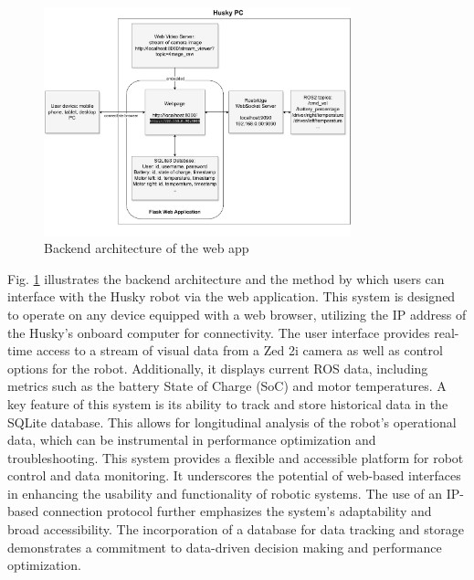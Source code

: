 \documentclass[conference]{IEEEtran}
\begin{document}
\begin{figure}[tp]
    \centerline{\includegraphics[width=8.9cm]{Pictures/userapp.pdf}}
    \caption{Backend architecture of the web app}
    \label{fig:userapp}
\end{figure}
Fig. \ref{fig:userapp} illustrates the backend architecture and the method by which users can interface with the Husky robot via the web application. This system is designed to operate on any device equipped with a web browser, utilizing the IP address of the Husky's onboard computer for connectivity.
The user interface provides real-time access to a stream of visual data from a Zed 2i camera as well as control options for the robot. Additionally, it displays current ROS data, including metrics such as the battery State of Charge (SoC) and motor temperatures.
A key feature of this system is its ability to track and store historical data in the SQLite database. This allows for longitudinal analysis of the robot's operational data, which can be instrumental in performance optimization and troubleshooting.
This system provides a flexible and accessible platform for robot control and data monitoring. It underscores the potential of web-based interfaces in enhancing the usability and functionality of robotic systems. 
The use of an IP-based connection protocol further emphasizes the system's adaptability and broad accessibility. The incorporation of a database for data tracking and storage demonstrates a commitment to data-driven decision making and performance optimization. 
\end{document}
